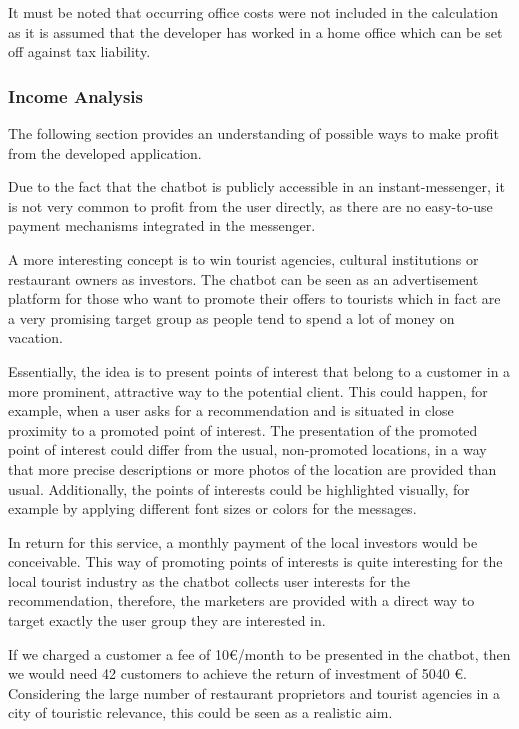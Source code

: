 It must be noted that occurring office costs were not included in the calculation as it is assumed that the developer has worked in a home office which can be set off against tax liability.

\subsubsection{Income Analysis}
The following section provides an understanding of possible ways to make profit from the developed application. 

Due to the fact that the chatbot is publicly accessible in an instant-messenger, it is not very common to profit from the user directly, as there are no easy-to-use payment mechanisms integrated in the messenger. 

A more interesting concept is to win tourist agencies, cultural institutions or restaurant owners as investors. The chatbot can be seen as an advertisement platform for those who want to promote their offers to tourists which in fact are a very promising target group as people tend to spend a lot of money on vacation.

Essentially, the idea is to present points of interest that belong to a customer in a more prominent, attractive way to the potential client. This could happen, for example, when a user asks for a recommendation and is situated in close proximity to a promoted point of interest. The presentation of the promoted point of interest could differ from the usual, non-promoted locations, in a way that more precise descriptions or more photos of the location are provided than usual. Additionally, the points of interests could be highlighted visually, for example by applying different font sizes or colors for the messages. 

In return for this service, a monthly payment of the local investors would be conceivable. 
This way of promoting points of interests is quite interesting for the local tourist industry as the chatbot collects user interests for the recommendation, therefore, the marketers are provided with a direct way to target exactly the user group they are interested in.

If we charged a customer a fee of 10€/month to be presented in the chatbot, then we would need 42 customers  to achieve the return of investment of 5040 €. Considering the large number of restaurant proprietors and tourist agencies in a city of touristic relevance, this could be seen as a realistic aim.


